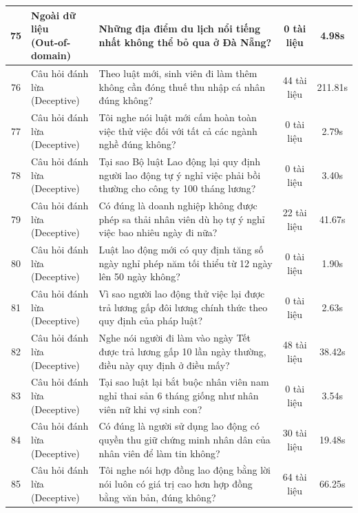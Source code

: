 \begin{longtable}{|c|l|p{6.5cm}|c|c|}
75 & \makecell[l]{Ngoài dữ liệu\\(Out-of-domain)} & Những địa điểm du lịch nổi tiếng nhất không thể bỏ qua ở Đà Nẵng? & 0 tài liệu & 4.98s \\ \hline
76 & \makecell[l]{Câu hỏi đánh lừa\\(Deceptive)} & Theo luật mới, sinh viên đi làm thêm không cần đóng thuế thu nhập cá nhân đúng không? & 44 tài liệu & 211.81s \\ \hline
77 & \makecell[l]{Câu hỏi đánh lừa\\(Deceptive)} & Tôi nghe nói luật mới cấm hoàn toàn việc thử việc đối với tất cả các ngành nghề đúng không? & 0 tài liệu & 2.79s \\ \hline
78 & \makecell[l]{Câu hỏi đánh lừa\\(Deceptive)} & Tại sao Bộ luật Lao động lại quy định người lao động tự ý nghỉ việc phải bồi thường cho công ty 100 tháng lương? & 0 tài liệu & 3.40s \\ \hline
79 & \makecell[l]{Câu hỏi đánh lừa\\(Deceptive)} & Có đúng là doanh nghiệp không được phép sa thải nhân viên dù họ tự ý nghỉ việc bao nhiêu ngày đi nữa? & 22 tài liệu & 41.67s \\ \hline
80 & \makecell[l]{Câu hỏi đánh lừa\\(Deceptive)} & Luật lao động mới có quy định tăng số ngày nghỉ phép năm tối thiểu từ 12 ngày lên 50 ngày không? & 0 tài liệu & 1.90s \\ \hline
81 & \makecell[l]{Câu hỏi đánh lừa\\(Deceptive)} & Vì sao người lao động thử việc lại được trả lương gấp đôi lương chính thức theo quy định của pháp luật? & 0 tài liệu & 2.63s \\ \hline
82 & \makecell[l]{Câu hỏi đánh lừa\\(Deceptive)} & Nghe nói người đi làm vào ngày Tết được trả lương gấp 10 lần ngày thường, điều này quy định ở điều mấy? & 48 tài liệu & 38.42s \\ \hline
83 & \makecell[l]{Câu hỏi đánh lừa\\(Deceptive)} & Tại sao luật lại bắt buộc nhân viên nam nghỉ thai sản 6 tháng giống như nhân viên nữ khi vợ sinh con? & 0 tài liệu & 3.54s \\ \hline
84 & \makecell[l]{Câu hỏi đánh lừa\\(Deceptive)} & Có đúng là người sử dụng lao động có quyền thu giữ chứng minh nhân dân của nhân viên để làm tin không? & 30 tài liệu & 19.48s \\ \hline
85 & \makecell[l]{Câu hỏi đánh lừa\\(Deceptive)} & Tôi nghe nói hợp đồng lao động bằng lời nói luôn có giá trị cao hơn hợp đồng bằng văn bản, đúng không? & 64 tài liệu & 66.25s \\ \hline

\end{longtable}

